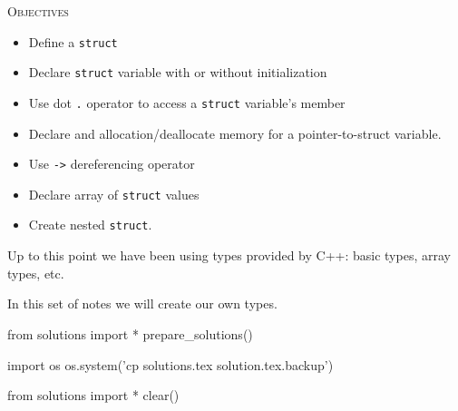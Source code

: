 
\textsc{Objectives}
\begin{itemize}
\item Define a \texttt{struct}
\item Declare \texttt{struct} variable with or without initialization
\item Use dot \texttt{.} operator to access a \texttt{struct} variable's member
\item Declare and allocation/deallocate memory for a pointer-to-struct variable.
\item Use \texttt{->} dereferencing operator
\item Declare array of \texttt{struct} values
\item Create nested \texttt{struct}.
\end{itemize}

Up to this point we have been using types provided by C++: basic types, array types, etc.

In this set of notes we will create our own types.











\begin{python0}
from solutions import *
prepare_solutions()
\end{python0}
\begin{python}
import os
os.system('cp solutions.tex solution.tex.backup')  
\end{python}

\begin{python0}
from solutions import *
clear()
\end{python0}
